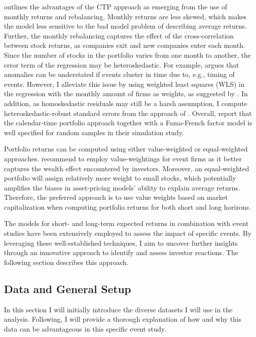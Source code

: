 \cite{fama1998_events} outlines the advantages of the CTP approach as emerging from the use of monthly returns and rebalancing. Monthly returns are less skewed, which makes the model less sensitive to the bad model problem of describing average returns. Further, the monthly rebalancing captures the effect of the cross-correlation between stock returns, as companies exit and new companies enter each month. Since the number of stocks in the portfolio varies from one month to another, the error term of the regression may be heteroskedastic. For example, \cite{ritter1995} argues that anomalies can be understated if events cluster in time due to, e.g., timing of events. However, I alleviate this issue by using weighted least squares (WLS) in the regression with the monthly amount of firms as weights, as suggested by \cite{Ang_event_method}. In addition, as homoskedastic residuals may still be a harsh assumption, I compute heteroskedastic-robust standard errors from the approach of \cite{white1980heteroskedasticity}. Overall, \cite{lyon1999improved} report that the calendar-time portfolio approach together with a Fama-French factor model is well specified for random samples in their simulation study. 

Portfolio returns can be computed using either value-weighted or equal-weighted approaches. \cite{fama1998_events} recommend to employ value-weightings for event firms as it better captures the wealth effect encountered by investors. Moreover, an equal-weighted portfolio will assign relatively more weight to small stocks, which potentially amplifies the biases in asset-pricing models' ability to explain average returns. Therefore, the preferred approach is to use value weights based on market capitalization when computing portfolio returns for both short and long horizons. 

The models for short- and long-term expected returns in combination with event studies have been extensively employed to assess the impact of specific events. By leveraging these well-established techniques, I aim to uncover further insights through an innovative approach to identify and assess investor reactions. The following section describes this approach. 

\subsection{Data and General Setup}

In this section I will initially introduce the diverse datasets I will use in the analysis. Following, I will provide a thorough explanation of how and why this data can be advantageous in this specific event study.    

